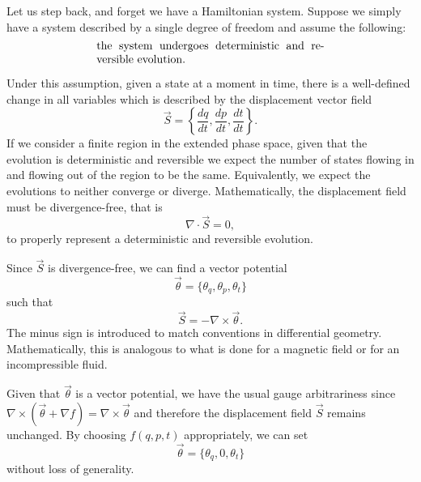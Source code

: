 \documentclass[10pt,twocolumn, nofootinbib]{revtex4-2}
\begin{document}
Let us step back, and forget we have a Hamiltonian system. Suppose we simply have a system described by a single degree of freedom and assume the following:
\begin{align}\label{Detrev_assumptions}
	\parbox{2.8in}{the system undergoes deterministic and reversible evolution.}
\end{align}

Under this assumption, given a state at a moment in time, there is a well-defined change in all variables which is described by the displacement vector field
\begin{equation}
	\vec{S} = \left\{ \frac{dq}{dt},\frac{dp}{dt},\frac{dt}{dt} \right\}.
\end{equation}
If we consider a finite region in the extended phase space, given that the evolution is deterministic and reversible we expect the number of states flowing in and flowing out of the region to be the same. Equivalently, we expect the evolutions to neither converge or diverge. Mathematically, the displacement field must be divergence-free, that is
\begin{equation}
	\nabla \cdot \vec{S} = 0,
\end{equation}
to properly represent a deterministic and reversible evolution.

Since $\vec{S}$ is divergence-free, we can find a vector potential
\begin{equation}
	\vec{\theta} = \{\theta_q, \theta_p, \theta_t\}
\end{equation}
such that
\begin{equation}\label{displacement_has_potential}
	\vec{S} = - \nabla \times \vec{\theta}.
\end{equation}
The minus sign is introduced to match conventions in differential geometry. Mathematically, this is analogous to what is done for a magnetic field or for an incompressible fluid.

Given that $\vec{\theta}$ is a vector potential, we have the usual gauge arbitrariness since $\nabla \times(\vec{\theta} + \nabla f) = \nabla \times \vec{\theta}$ and therefore the displacement field $\vec{S}$ remains unchanged. By choosing $f(q,p,t)$ appropriately, we can set
\begin{equation}
	\vec{\theta} = \{\theta_q, 0, \theta_t\}
\end{equation}
without loss of generality.
\end{document}
